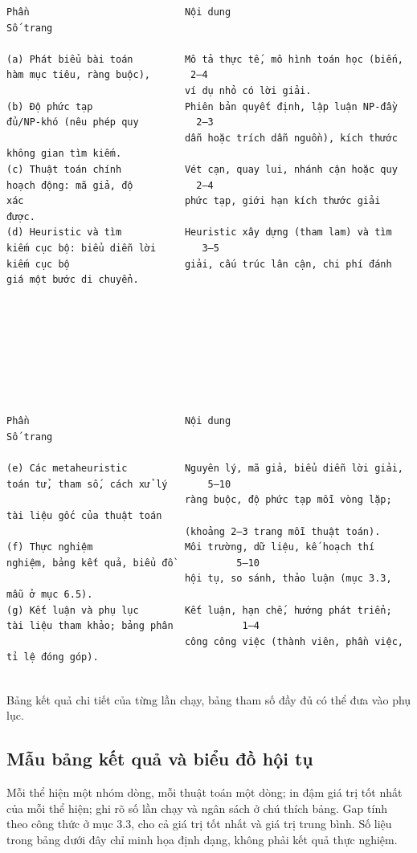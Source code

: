 \documentclass[a4paper,11pt]{article}
\begin{document}
\begin{Verbatim}[fontsize=\tiny,breaklines=true,breakanywhere=true]
Phần                           Nội dung                                                            Số trang

(a) Phát biểu bài toán         Mô tả thực tế, mô hình toán học (biến, hàm mục tiêu, ràng buộc),       2–4
                               ví dụ nhỏ có lời giải.
(b) Độ phức tạp                Phiên bản quyết định, lập luận NP-đầy đủ/NP-khó (nêu phép quy          2–3
                               dẫn hoặc trích dẫn nguồn), kích thước không gian tìm kiếm.
(c) Thuật toán chính           Vét cạn, quay lui, nhánh cận hoặc quy hoạch động: mã giả, độ           2–4
xác                            phức tạp, giới hạn kích thước giải được.
(d) Heuristic và tìm           Heuristic xây dựng (tham lam) và tìm kiếm cục bộ: biểu diễn lời        3–5
kiếm cục bộ                    giải, cấu trúc lân cận, chi phí đánh giá một bước di chuyển.








Phần                           Nội dung                                                                Số trang

(e) Các metaheuristic          Nguyên lý, mã giả, biểu diễn lời giải, toán tử, tham số, cách xử lý       5–10
                               ràng buộc, độ phức tạp mỗi vòng lặp; tài liệu gốc của thuật toán
                               (khoảng 2–3 trang mỗi thuật toán).
(f) Thực nghiệm                Môi trường, dữ liệu, kế hoạch thí nghiệm, bảng kết quả, biểu đồ           5–10
                               hội tụ, so sánh, thảo luận (mục 3.3, mẫu ở mục 6.5).
(g) Kết luận và phụ lục        Kết luận, hạn chế, hướng phát triển; tài liệu tham khảo; bảng phân            1–4
                               công công việc (thành viên, phần việc, tỉ lệ đóng góp).


\end{Verbatim}
Bảng kết quả chi tiết của từng lần chạy, bảng tham số đầy đủ có thể đưa vào phụ lục.

\subsection{Mẫu bảng kết quả và biểu đồ hội tụ}
Mỗi thể hiện một nhóm dòng, mỗi thuật toán một dòng; in đậm giá trị tốt nhất của mỗi thể hiện; ghi rõ số lần chạy và ngân sách ở chú thích bảng. Gap tính theo công thức ở mục 3.3, cho cả giá trị tốt nhất và giá trị trung bình. Số liệu trong bảng dưới đây chỉ minh họa định dạng, không phải kết quả thực nghiệm.
\end{document}
